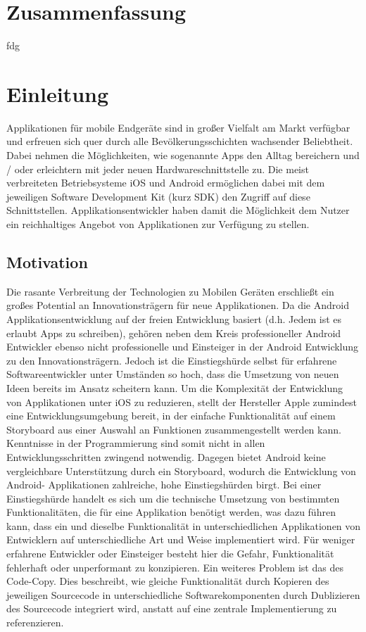 \documentclass[12pt,oneside,a4paper,bibtotoc,liststotoc]{scrreprt}
\begin{document}
\onehalfspacing %

\chapter*{Zusammenfassung}

fdg\newline

\tableofcontents
\listoffigures


\chapter{Einleitung}
Applikationen für mobile Endgeräte sind in großer Vielfalt am Markt verfügbar und erfreuen sich quer durch alle Bevölkerungsschichten wachsender Beliebtheit. Dabei nehmen die Möglichkeiten, wie sogenannte Apps den Alltag bereichern und / oder erleichtern mit jeder neuen Hardwareschnittstelle zu. Die meist verbreiteten Betriebsysteme iOS und Android ermöglichen dabei mit dem jeweiligen Software Development Kit (kurz SDK) den Zugriff auf diese Schnittstellen. Applikationsentwickler haben damit die Möglichkeit dem Nutzer ein reichhaltiges Angebot von Applikationen zur Verfügung zu stellen.
\section{Motivation}
Die rasante Verbreitung der Technologien zu Mobilen Geräten erschließt ein großes Potential an Innovationsträgern für neue Applikationen. Da die Android Applikationsentwicklung auf der freien Entwicklung basiert (d.h. Jedem ist es erlaubt Apps zu schreiben), gehören neben dem Kreis professioneller Android Entwickler ebenso nicht professionelle und Einsteiger in der Android Entwicklung zu den Innovationsträgern. Jedoch ist die Einstiegshürde selbst für erfahrene Softwareentwickler unter Umständen so hoch, dass die Umsetzung von neuen Ideen bereits im Ansatz scheitern kann. Um die Komplexität der Entwicklung von Applikationen unter iOS zu reduzieren, stellt der Hersteller Apple zumindest eine Entwicklungsumgebung bereit, in der einfache Funktionalität auf einem Storyboard aus einer Auswahl an Funktionen zusammengestellt werden kann. Kenntnisse in der Programmierung sind somit nicht in allen Entwicklungsschritten zwingend notwendig. Dagegen bietet Android keine vergleichbare Unterstützung durch ein Storyboard, wodurch die Entwicklung von Android- Applikationen zahlreiche, hohe Einstiegshürden birgt. Bei einer Einstiegshürde handelt es sich um die technische Umsetzung von bestimmten Funktionalitäten, die für eine Applikation benötigt werden, was  dazu führen kann, dass ein und dieselbe Funktionalität in unterschiedlichen Applikationen von Entwicklern auf unterschiedliche Art und Weise implementiert wird. Für weniger erfahrene Entwickler oder Einsteiger besteht hier die Gefahr, Funktionalität fehlerhaft oder unperformant zu konzipieren.\newline
Ein weiteres Problem ist das des Code-Copy. Dies beschreibt, wie gleiche Funktionalität durch Kopieren des jeweiligen Sourcecode in unterschiedliche Softwarekomponenten durch Dublizieren des Sourcecode integriert wird, anstatt auf eine zentrale Implementierung zu referenzieren.
\end{document}
